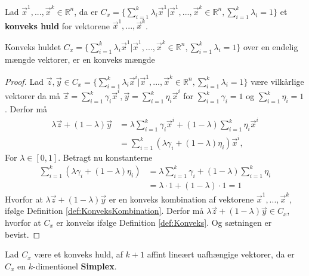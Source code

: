 \begin{defn}
Lad $\vec{x}^1, ...,\vec{x}^k \in \mathds{R}^n$, da er $C_{x} = \{\sum_{i=1}^k \lambda_i \vec{x}^1| \vec{x}^1, ...,\vec{x}^k \in \mathds{R}^n, \sum_{i=1}^k \lambda_i =1\}$ et \textbf{konveks huld} for vektorene $\vec{x}^1, ...,\vec{x}^k$. 
\label{def:Konvekshuld}
\end{defn}

\begin{stn}
Konveks huldet $C_x = \{\sum_{i=1}^k \lambda_i \vec{x}^1| \vec{x}^1, ...,\vec{x}^k \in \mathds{R}^n, \sum_{i=1}^k \lambda_i =1\}$ over en endelig mængde vektorer, er en konveks mængde
\end{stn}

\begin{proof}
Lad $\vec{z}, \vec{y}\in C_x = \{\sum_{i=1}^k \lambda_i \vec{x}^i| \vec{x}^1, ...,\vec{x}^k \in \mathds{R}^n, \sum_{i=1}^k \lambda_i =1\}$ være vilkårlige vektorer da må $\vec{z}= \sum_{i=1}^k \gamma_i \vec{x}^i, \vec{y}= \sum_{i=1}^k \eta_i \vec{x}^i$ for $\sum_{i=1}^k \gamma_i = 1$ og  $\sum_{i=1}^k \eta_i = 1$. 
Derfor må
\begin{align*}
	\lambda \vec{z} + (1- \lambda) \vec{y} &= \lambda\sum_{i=1}^k \gamma_i \vec{x}^i + (1-\lambda)\sum_{i=1}^k \eta_i \vec{x}^i
	\\ &=\sum_{i=1}^k (\lambda \gamma_i+(1-\lambda)\eta_i )\vec{x}^i,
\end{align*}
For $\lambda \in [0,1]$.
Betragt nu konstanterne 
\begin{align*}
	\sum_{i=1}^k (\lambda \gamma_i+(1-\lambda)\eta_i ) &= \lambda \sum_{i=1}^k \gamma_i + (1 - \lambda) \sum_{i=1}^k \eta_i 
	\\ &= \lambda \cdot 1 + (1 - \lambda) \cdot 1 = 1
\end{align*}
Hvorfor at $\lambda \vec{z} + (1- \lambda) \vec{y} $ er en konveks kombination af vektorene $\vec{x}^1, ...,\vec{x}^k $, ifølge Definition \ref{def:KonveksKombination}. 
Derfor må $ \lambda \vec{z} + (1- \lambda) \vec{y} \in C_x$, hvorfor at $C_x$ er konveks ifølge Definition \ref{def:Konveks}.
Og sætningen er bevist.
\end{proof}

\begin{defn}[Simplex]
Lad $C_x$ være et konveks huld, af $k+1$ affint lineært uafhængige vektorer, da er $C_x$ en $k$-dimentionel \textbf{Simplex}.
\end{defn}